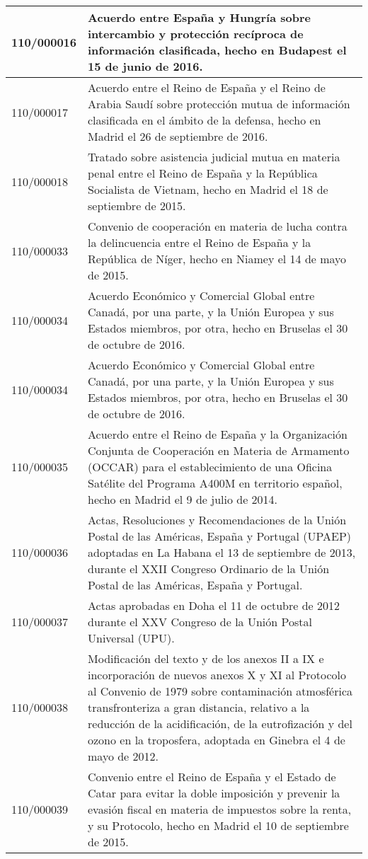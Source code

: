 {\begin{table}[H]
\begin{center}
\begin{tabularx}{\linewidth}{| l | X |}
\hline
110/000016 & Acuerdo entre España y Hungría sobre intercambio y protección recíproca de información clasificada, hecho en Budapest el 15 de junio de 2016. \\
\hline
110/000017 & Acuerdo entre el Reino de España y el Reino de Arabia Saudí sobre protección mutua de información clasificada en el ámbito de la defensa, hecho en Madrid el 26 de septiembre de 2016. \\
\hline
110/000018 & Tratado sobre asistencia judicial mutua en materia penal entre el Reino de España y la República Socialista de Vietnam, hecho en Madrid el 18 de septiembre de 2015. \\
\hline
110/000033 & Convenio de cooperación en materia de lucha contra la delincuencia entre el Reino de España y la República de Níger, hecho en Niamey el 14 de mayo de 2015. \\
\hline
110/000034 & Acuerdo Económico y Comercial Global entre Canadá, por una parte, y la Unión Europea y sus Estados miembros, por otra, hecho en Bruselas el 30 de octubre de 2016. \\
\hline
110/000034 & Acuerdo Económico y Comercial Global entre Canadá, por una parte, y la Unión Europea y sus Estados miembros, por otra, hecho en Bruselas el 30 de octubre de 2016. \\
\hline
110/000035 & Acuerdo entre el Reino de España y la Organización Conjunta de Cooperación en Materia de Armamento (OCCAR) para el establecimiento de una Oficina Satélite del Programa A400M en territorio español, hecho en Madrid el 9 de julio de 2014. \\
\hline
110/000036 & Actas, Resoluciones y Recomendaciones de la Unión Postal de las Américas, España y Portugal (UPAEP) adoptadas en La Habana el 13 de septiembre de 2013, durante el XXII Congreso Ordinario de la Unión Postal de las Américas, España y Portugal. \\
\hline
110/000037 & Actas aprobadas en Doha el 11 de octubre de 2012 durante el XXV Congreso de la Unión Postal Universal (UPU). \\
\hline
110/000038 & Modificación del texto y de los anexos II a IX e incorporación de nuevos anexos X y XI al Protocolo al Convenio de 1979 sobre contaminación atmosférica transfronteriza a gran distancia, relativo a la reducción de la acidificación, de la eutrofización y del ozono en la troposfera, adoptada en Ginebra el 4 de mayo de 2012. \\
\hline
110/000039 & Convenio entre el Reino de España y el Estado de Catar para evitar la doble imposición y prevenir la evasión fiscal en materia de impuestos sobre la renta, y su Protocolo, hecho en Madrid el 10 de septiembre de 2015. \\

\end{tabularx}
\end{center}
\end{table}}
